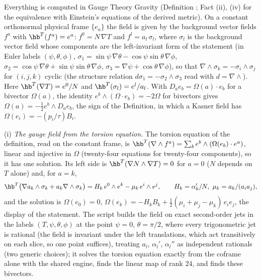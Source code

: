 Everything is computed in Gauge Theory Gravity (Definition ; Fact (ii), (iv) for the equivalence with Einstein's equations of the derived metric). On a constant orthonormal physical frame $\{e_{a}\}$ the field is given by the background vector fields $f^{a}$ with $\hb^{T}(f^{a}) = e^{a}$: $f^{0} = N\,\nabla T$ and $f^{l} = a_{l}\,\sigma_{l}$, where $\sigma_{l}$ is the background vector field whose components are the left-invariant form of the statement (in Euler labels $(\psi, \theta, \phi)$, $\sigma_{1} = \sin\psi\,\nabla\theta - \cos\psi\sin\theta\,\nabla\phi$, $\sigma_{2} = \cos\psi\,\nabla\theta + \sin\psi\sin\theta\,\nabla\phi$, $\sigma_{3} = \nabla\psi + \cos\theta\,\nabla\phi$), so that $\nabla\wedge\sigma_{k} = -\sigma_{i}\wedge\sigma_{j}$ for $(i, j, k)$ cyclic (the structure relation $d\sigma_{1} = -\sigma_{2}\wedge\sigma_{3}$ read with $d = \nabla\wedge$). Here $\hb^{T}(\nabla T) = e^{0}/N$ and $\hb^{T}(\sigma_{l}) = e^{l}/a_{l}$. With $D_{a}e_{b} = \Omega(a)\cdot e_{b}$ for a bivector $\Omega(a)$, the identity $e^{b}\wedge(\Omega\cdot e_{b}) = -2\Omega$ for bivectors gives $\Omega(a) = -\tfrac12 e^{b}\wedge D_{a}e_{b}$, the sign of the Definition, in which a Kasner field has $\Omega(e_{i}) = -(p_{i}/\tau)B_{i}$.

(i) \emph{The gauge field from the torsion equation.} The torsion equation of the definition, read on the constant frame, is $\hb^{T}(\nabla\wedge f^{a}) = \sum_{b}e^{b}\wedge(\Omega(e_{b})\cdot e^{a})$, linear and injective in $\Omega$ (twenty-four equations for twenty-four components), so it has one solution. Its left side is $\hb^{T}(\nabla N\wedge\nabla T) = 0$ for $a = 0$ ($N$ depends on $T$ alone) and, for $a = k$,
\[
\hb^{T}\bigl(\nabla a_{k}\wedge\sigma_{k} + a_{k}\nabla\wedge\sigma_{k}\bigr) = H_{k}\,e^{0}\wedge e^{k} - \mu_{k}\,e^{i}\wedge e^{j}, \qquad H_{k} = \alpha_{k}'/N,\ \mu_{k} = a_{k}/(a_{i}a_{j}),
\]
and the solution is $\Omega(e_{0}) = 0$, $\Omega(e_{k}) = -H_{k}B_{k} + \tfrac12(\mu_{i} + \mu_{j} - \mu_{k})\,e_{i}e_{j}$, the display of the statement. The script builds the field on exact second-order jets in the labels $(T, \psi, \theta, \phi)$ at the point $\psi = 0$, $\theta = \pi/2$, where every trigonometric jet is rational (the field is invariant under the left translations, which act transitively on each slice, so one point suffices), treating $a_{l}$, $\alpha_{l}'$, $\alpha_{l}''$ as independent rationals (two generic choices); it solves the torsion equation exactly from the coframe alone with the shared engine, finds the linear map of rank $24$, and finds these bivectors.

